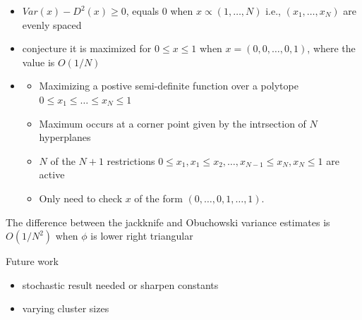 \documentclass{beamer}
\newcommand{\V}{Var}
\newcommand{\I}{N}
\begin{document}
\begin{frame}
  \begin{itemize}
  \item $\V(x)-D^2(x)\ge 0$, equals $0$ when $x\propto (1,\ldots,\I)$ i.e., $(x_{1},\ldots,x_{\I})$ are evenly spaced
  \item conjecture it is maximized for $0\le x\le 1$ when $x=(0,0,\ldots,0,1)$, where the value is $O(1/\I)$
  \item \begin{itemize}
      \item Maximizing a postive semi-definite function over a
        polytope $0\le x_1\le\ldots\le x_{\I}\le 1$
      \item Maximum occurs at a
        corner point given by the intrsection of $\I$ hyperplanes
        \item $\I$ of the $\I+1$ restrictions
    $0\le x_1, x_1\le x_2,\ldots,x_{\I-1}\le x_{\I}, x_{\I}\le 1$ are
    active
  \item Only need to check $x$ of the form  $(0,\ldots,0,1,\ldots,1)$.
  \end{itemize}
\end{itemize}
\end{frame}
\begin{frame}
  The difference between the jackknife and Obuchowski variance estimates is $O(1/\I^2)$ when $\phi$ is lower right triangular
\end{frame}


\begin{frame}
  Future work
  \begin{itemize}
  \item stochastic result needed or sharpen constants
  \item   varying cluster sizes
  \end{itemize}
\end{frame}


\end{document}
